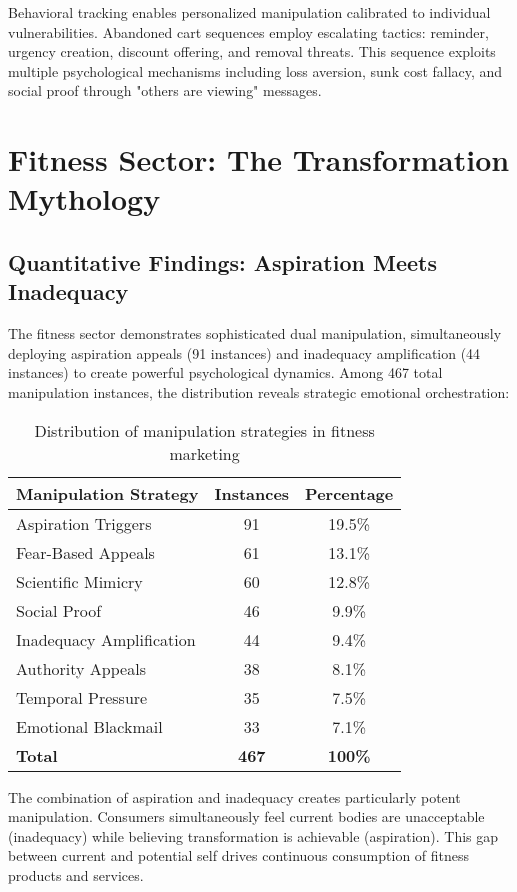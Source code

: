 Behavioral tracking enables personalized manipulation calibrated to individual vulnerabilities. Abandoned cart sequences employ escalating tactics: reminder, urgency creation, discount offering, and removal threats. This sequence exploits multiple psychological mechanisms including loss aversion, sunk cost fallacy, and social proof through "others are viewing" messages.

\section{Fitness Sector: The Transformation Mythology}
\label{sec:fitness_analysis}

\subsection{Quantitative Findings: Aspiration Meets Inadequacy}

The fitness sector demonstrates sophisticated dual manipulation, simultaneously deploying aspiration appeals (91 instances) and inadequacy amplification (44 instances) to create powerful psychological dynamics. Among 467 total manipulation instances, the distribution reveals strategic emotional orchestration:

\begin{table}[h]
\centering
\begin{tabular}{|l|c|c|}
\hline
\textbf{Manipulation Strategy} & \textbf{Instances} & \textbf{Percentage} \\
\hline
Aspiration Triggers & 91 & 19.5\% \\
Fear-Based Appeals & 61 & 13.1\% \\
Scientific Mimicry & 60 & 12.8\% \\
Social Proof & 46 & 9.9\% \\
Inadequacy Amplification & 44 & 9.4\% \\
Authority Appeals & 38 & 8.1\% \\
Temporal Pressure & 35 & 7.5\% \\
Emotional Blackmail & 33 & 7.1\% \\
\hline
\textbf{Total} & \textbf{467} & \textbf{100\%} \\
\hline
\end{tabular}
\caption{Distribution of manipulation strategies in fitness marketing}
\end{table}

The combination of aspiration and inadequacy creates particularly potent manipulation. Consumers simultaneously feel current bodies are unacceptable (inadequacy) while believing transformation is achievable (aspiration). This gap between current and potential self drives continuous consumption of fitness products and services.

